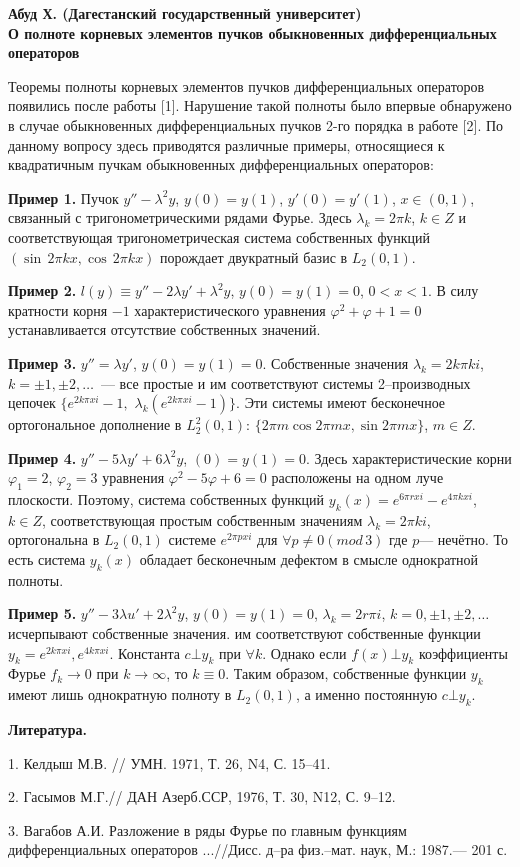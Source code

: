 \begin{center}
{\bf Абуд Х. (Дагестанский государственный университет)\\
О полноте корневых элементов пучков обыкновенных дифференциальных операторов}
\end{center}

Теоремы полноты корневых элементов пучков дифференциальных операторов появились после работы  [1]. Нарушение такой полноты было впервые обнаружено в случае обыкновенных дифференциальных пучков 2-го порядка в работе [2]. По данному вопросу здесь приводятся различные примеры, относящиеся к квадратичным пучкам обыкновенных дифференциальных операторов:

{\bf Пример 1.} Пучок $y''-\lambda^2y$, $y(0)=y(1)$, $y'(0)=y'(1)$, $x\in(0,1)$, связанный с тригонометрическими рядами Фурье. Здесь $\lambda_k=2\pi k$, $k\in Z$ и соответствующая тригонометрическая система собственных функций $(\sin\,2\pi k x,\cos\,2\pi k x)$ порождает двукратный базис в $L_2(0,1)$.

{\bf Пример 2.} $l(y)\equiv y''-2\lambda y'+\lambda^2y$, $y(0)=y(1)=0$, $0<x<1$. В силу кратности корня $-1$ характеристического уравнения $\varphi^2+\varphi+1=0$ устанавливается отсутствие  собственных значений.

{\bf Пример 3.}
$y''=\lambda y'$, $y(0)=y(1)=0$.
Собственные значения $\lambda_k=2k\pi k i$, $k=\pm1,\pm2,\dots$~--- все простые
и им соответствуют системы 2--производных цепочек $\{e^{2k\pi xi}-1,$ $\lambda_k(e^{2k\pi xi}-1)\}$.
Эти системы имеют бесконечное ортогональное дополнение в
$L_2^2(0,1)$: $\{2\pi m\cos2\pi mx,\sin 2\pi mx\}$, $m\in Z$.

{\bf Пример 4.} $y''-5\lambda y'+6\lambda^2y$, $(0)=y(1)=0$. Здесь характеристические корни $\varphi_1=2$, $\varphi_2=3$ уравнения $\varphi^2-5\varphi+6=0$ расположены на одном луче плоскости. Поэтому, система собственных функций $y_k(x)=e^{6\pi r xi}-e^{4\pi k xi}$, $k\in Z$, соответствующая простым собственным значениям $\lambda_k=2\pi k i$, ортогональна в $L_2(0,1)$ системе $e^{2\pi pxi}$ для $\forall p\neq 0(mod\,3)$ где $p$--- нечётно. То есть система $y_k(x)$ обладает бесконечным дефектом в смысле однократной полноты.

{\bf Пример 5.} $y''-3\lambda u'+2\lambda^2y$, $y(0)=y(1)=0$, $\lambda_k=2r\pi i$, $k=0,\pm1,\pm2,\dots$ исчерпывают собственные значения. им соответствуют собственные функции $y_k=e^{2k\pi xi},e^{4k\pi xi}$. Константа $c\bot y_k$ при $\forall k$. Однако если $f(x)\bot y_k$ коэффициенты Фурье $f_k\to0$ при $k\to\infty$, то $k\equiv0$. Таким образом, собственные функции $y_k$ имеют лишь однократную полноту в $L_2(0,1)$, а именно постоянную $c\bot y_k$.

{\bf Литература.}

1. Келдыш М.В. // УМН. 1971, Т. 26, N4, С. 15--41.

2. Гасымов М.Г.// ДАН Азерб.ССР, 1976, Т. 30, N12, С. 9--12.

3. Вагабов А.И. Разложение в ряды Фурье по главным функциям дифференциальных операторов ...//Дисс. д--ра физ.--мат. наук, М.: 1987.--- 201 с.

